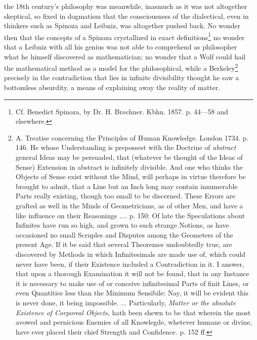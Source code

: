 \documentclass[12pt,a4paper,openany]{book}
\newcommand{\opage}[1]{\marginnote{\footnotesize\textit{[#1]}}}
\begin{document}
the 18th century's philosophy was meanwhile, inasmuch as
it was not altogether skeptical, so fixed in dogmatism that
the consciousness of the dialectical, even in thinkers such as
Spinoza and Leibniz, was altogether pushed back. No wonder
then that the concepts of a Spinoza crystallized in exact
definitions\footnote[2]{Cf. Benedict Spinoza, by Dr. H. Brøchner. Kbhn. 1857. p. 44—58 and elsewhere.} no wonder that a Leibniz with all his genius
\setcounter{footnote}{0}%
\opage{120}was not able to comprehend as philosopher what he himself
discovered as mathematician; no wonder that a Wolf could
hail the mathematical method as a model for the philosophical,
while a Berkeley\footnote[1]{A. Treatise concerning the Principles of Human Knowledge. London 1734. p. 146. He whose Understanding is prepossest with the Doctrine of \emph{abstract} general Ideas may be persuaded, that (whatever be thought of the Ideas of Sense) Extension in abstract is infinitely divisible. And one who thinks the Objects of Sense exist without the Mind, will perhaps in virtue therefore be brought to admit, that a Line but an Inch long may contain innumerable Parts really existing, though too small to be discerned. These Errors are grafted as well in the Minds of Geometricians, as of other Men, and have a like influence on their Reasonings .... p. 150: Of late the Speculations about Infinites have run so high, and grown to such strange Notions, as have occasioned no small Scruples and Disputes among the Geometers of the present Age. If it be said that several Theoremes undoubtedly true, are discovered by Methods in which Infinitesimals are made use of, which could never have been, if their Existence included a Contradiction in it. I answer, that upon a thorough Examination it will not be found, that in any Instance it is necessary to make use of or conceive infinitesimal Parts of finit Lines, or even Quantities less than the Minimum Sensibile: Nay, it will be evident this is never done, it being impossible. ... Particularly, \emph{Matter or the absolute Existence of Corporeal Objects,} hath been shewn to be that wherein the most avowed and pernicious Enemies of all Knowlegde, whetever humane or divine, have ever placed their chief Strength and Confidence. p. 152 ff.} precisely in the contradiction that
lies in infinite divisibility thought he saw a bottomless
absurdity, a means of explaining away the reality of matter.
\end{document}
